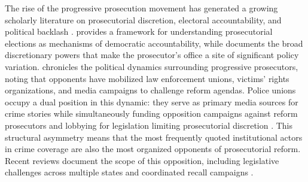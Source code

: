 \documentclass[12pt, letterpaper]{article}
\begin{document}
The rise of the progressive prosecution movement has generated a growing scholarly literature on prosecutorial discretion, electoral accountability, and political backlash \citep{pfaff2017,sklansky2017,bellin2019}. \citet{wright2009} provides a framework for understanding prosecutorial elections as mechanisms of democratic accountability, while \citet{davis2007} documents the broad discretionary powers that make the prosecutor's office a site of significant policy variation. \citet{bazelon2019} chronicles the political dynamics surrounding progressive prosecutors, noting that opponents have mobilized law enforcement unions, victims' rights organizations, and media campaigns to challenge reform agendas. Police unions occupy a dual position in this dynamic: they serve as primary media sources for crime stories while simultaneously funding opposition campaigns against reform prosecutors and lobbying for legislation limiting prosecutorial discretion \citep{goldstein2024}. This structural asymmetry means that the most frequently quoted institutional actors in crime coverage are also the most organized opponents of prosecutorial reform. Recent reviews document the scope of this opposition, including legislative challenges across multiple states and coordinated recall campaigns \citep{mitchell2025}.
\end{document}
